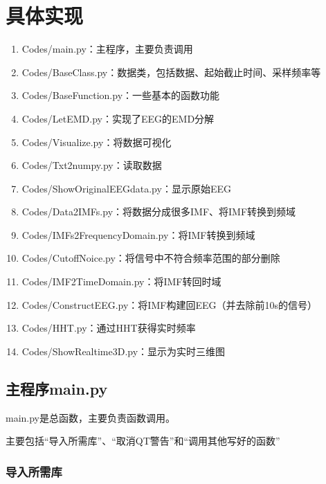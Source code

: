 \documentclass[cs4size,a4paper]{ctexart}
\numberwithin{equation}{section}
\numberwithin{table}{section}
\numberwithin{figure}{section}
\begin{document}
\section{具体实现}

\begin{enumerate}
\item \colorbox{LetMeFlyGray}{Codes/main.py}：主程序，主要负责调用
\item \colorbox{LetMeFlyGray}{Codes/BaseClass.py}：数据类，包括数据、起始截止时间、采样频率等
\item \colorbox{LetMeFlyGray}{Codes/BaseFunction.py}：一些基本的函数功能
\item \colorbox{LetMeFlyGray}{Codes/LetEMD.py}：实现了EEG的EMD分解
\item \colorbox{LetMeFlyGray}{Codes/Visualize.py}：将数据可视化
\item \colorbox{LetMeFlyGray}{Codes/Txt2numpy.py}：读取数据
\item \colorbox{LetMeFlyGray}{Codes/ShowOriginalEEGdata.py}：显示原始EEG
\item \colorbox{LetMeFlyGray}{Codes/Data2IMFs.py}：将数据分成很多IMF、将IMF转换到频域
\item \colorbox{LetMeFlyGray}{Codes/IMFs2FrequencyDomain.py}：将IMF转换到频域
\item \colorbox{LetMeFlyGray}{Codes/CutoffNoice.py}：将信号中不符合频率范围的部分删除
\item \colorbox{LetMeFlyGray}{Codes/IMF2TimeDomain.py}：将IMF转回时域
\item \colorbox{LetMeFlyGray}{Codes/ConstructEEG.py}：将IMF构建回EEG（并去除前10s的信号）
\item \colorbox{LetMeFlyGray}{Codes/HHT.py}：通过HHT获得实时频率
\item \colorbox{LetMeFlyGray}{Codes/ShowRealtime3D.py}：显示为实时三维图
\end{enumerate}

\subsection{主程序main.py}

\colorbox{LetMeFlyGray}{main.py}是总函数，主要负责函数调用。

主要包括“导入所需库”、“取消QT警告”和“调用其他写好的函数”

\subsubsection{导入所需库}
\end{document}
